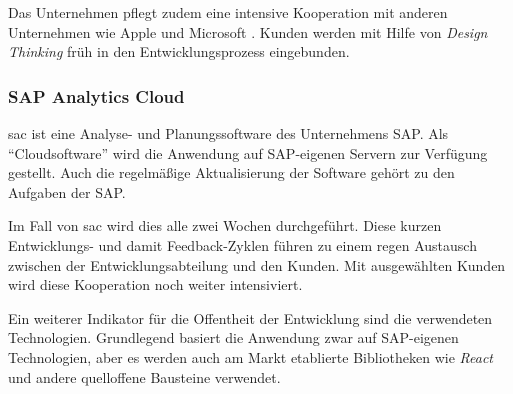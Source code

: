 Das Unternehmen pflegt zudem eine intensive Kooperation mit anderen Unternehmen
wie Apple \cite{Appleund81:online} und Microsoft \cite{Microsof58:online}.
Kunden werden mit Hilfe von \textit{Design Thinking} \cite{SAPDesig64:online} früh in den Entwicklungsprozess eingebunden.



\subsubsection{SAP Analytics Cloud}\label{sec:beispiele-sap-sac}
\ac{sac} ist eine Analyse- und Planungssoftware des Unternehmens SAP.
Als \enquote{Cloudsoftware} wird die Anwendung auf SAP-eigenen Servern zur Verfügung gestellt.
Auch die regelmäßige Aktualisierung der Software gehört zu den Aufgaben der SAP.

Im Fall von \ac{sac} wird dies alle zwei Wochen durchgeführt.
Diese kurzen Entwicklungs- und damit Feedback-Zyklen führen zu einem regen Austausch zwischen der Entwicklungsabteilung und den Kunden.
Mit ausgewählten Kunden wird diese Kooperation noch weiter intensiviert.

Ein weiterer Indikator für die Offentheit der Entwicklung sind die verwendeten Technologien.
Grundlegend basiert die Anwendung zwar auf SAP-eigenen Technologien,
aber es werden auch am Markt etablierte Bibliotheken wie \textit{React} und andere quelloffene Bausteine verwendet.

